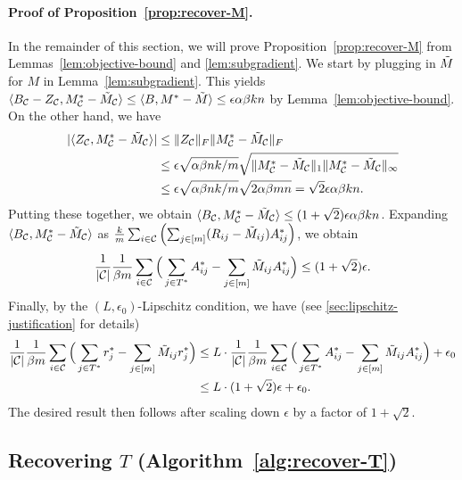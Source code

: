 \paragraph{Proof of Proposition~\ref{prop:recover-M}.}
In the remainder of this section, we will prove Proposition~\ref{prop:recover-M} 
from Lemmas~\ref{lem:objective-bound} and \ref{lem:subgradient}.
We start by plugging in $\tilde{M}$ for $M$ in Lemma~\ref{lem:subgradient}. This yields
$\langle B_{\mathcal{C}} - Z_{\mathcal{C}}, M^*_{\mathcal{C}} - \tilde{M}_{\mathcal{C}} \rangle \leq \langle B, M^* - \tilde{M} \rangle \leq \epsilon \alpha\beta kn$
by Lemma~\ref{lem:objective-bound}.
On the other hand, we have 
\begin{align}
|\langle Z_{\mathcal{C}}, M^*_{\mathcal{C}} - \tilde{M}_{\mathcal{C}} \rangle| &\leq \|Z_{\mathcal{C}}\|_F\|M^*_{\mathcal{C}} - \tilde{M}_{\mathcal{C}}\|_F \\
 &\leq \epsilon\sqrt{\alpha\beta nk/m} \sqrt{\|M^*_{\mathcal{C}} - \tilde{M}_{\mathcal{C}}\|_{1}\|M^*_{\mathcal{C}} - \tilde{M}_{\mathcal{C}}\|_{\infty}} \\
 &\leq \epsilon\sqrt{\alpha\beta nk/m} \sqrt{2\alpha\beta mn} = \sqrt{2}\epsilon\alpha\beta kn.
\end{align}
Putting these together, we obtain
$\langle B_{\mathcal{C}}, M^*_{\mathcal{C}} - \tilde{M}_{\mathcal{C}} \rangle \leq (1+\sqrt{2})\epsilon \alpha\beta kn$.
Expanding $\langle B_{\mathcal{C}}, M^*_{\mathcal{C}} - \tilde{M}_{\mathcal{C}} \rangle$ as 
$\frac{k}{m}\sum_{i \in \mathcal{C}}\left( \sum_{j \in [m]} (R_{ij} - \tilde{M}_{ij})A^*_{ij} \right)$,
we obtain 
\[ \frac{1}{|\mathcal{C}|}\frac{1}{\beta m}\sum_{i \in \mathcal{C}}\Big(\sum_{j \in T^*} A^*_{ij} - \sum_{j \in [m]} \tilde{M}_{ij}A^*_{ij}\Big) \leq (1+\sqrt{2})\epsilon. \]
Finally, by the $(L,\epsilon_0)$-Lipschitz condition, we have (see \ref{sec:lipschitz-justification} for details)
\begin{align}
\frac{1}{|\mathcal{C}|}\frac{1}{\beta m}\sum_{i \in \mathcal{C}}\Big(\sum_{j \in T^*} r^*_j - \sum_{j \in [m]} \tilde{M}_{ij}r^*_j\Big) 
&\leq L \cdot \frac{1}{|\mathcal{C}|}\frac{1}{\beta m}\sum_{i \in \mathcal{C}}\Big(\sum_{j \in T^*} A^*_{ij} - \sum_{j \in [m]} \tilde{M}_{ij}A^*_{ij}\Big) + \epsilon_0 \\
&\leq L \cdot (1+\sqrt{2})\epsilon + \epsilon_0.
\end{align}
The desired result then follows after scaling down $\epsilon$ 
by a factor of $1+\sqrt{2}$.

\subsection{Recovering $T$ (Algorithm~\ref{alg:recover-T})}
\label{sec:approach-T}
\label{sec:rounding}

